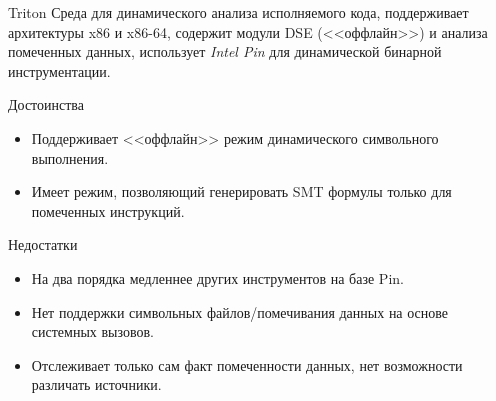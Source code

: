 \documentclass[10pt]{beamer}
\begin{document}
\begin{frame}{Triton}
    Среда для динамического анализа исполняемого кода, поддерживает архитектуры x86 и x86-64, содержит модули DSE (<<оффлайн>>) и анализа помеченных данных, использует \emph{Intel Pin} для динамической бинарной инструментации.
    \begin{block}{Достоинства}
        \begin{itemize}
        \item Поддерживает <<оффлайн>> режим динамического символьного выполнения.
        \item Имеет режим, позволяющий генерировать SMT формулы только для помеченных инструкций.
        \end{itemize}
    \end{block}

      \begin{block}{Недостатки}
          \begin{itemize}
      \item На два порядка медленнее других инструментов на базе Pin.
      \item Нет поддержки символьных файлов/помечивания данных на основе системных вызовов.
      \item Отслеживает только сам факт помеченности данных, нет возможности различать источники.
      \end{itemize}
    \end{block}

\end{frame}

\end{document}
